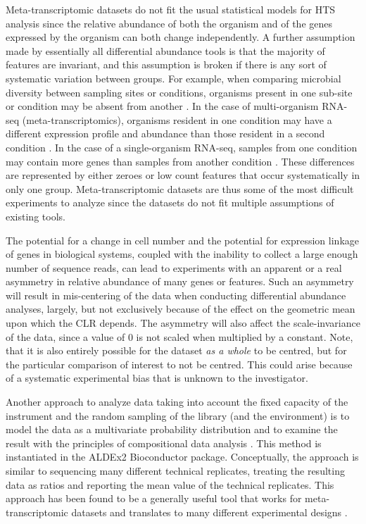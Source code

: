 \documentclass{bmcart}
\begin{document}
Meta-transcriptomic datasets do not fit the usual statistical models for HTS analysis since the relative abundance of both the organism and of the genes expressed by the organism can both change independently. A further assumption made by essentially all differential abundance tools is that the majority of features are invariant, and this assumption is broken if there is any sort of systematic variation between groups. For example, when comparing microbial diversity between sampling sites or conditions, organisms present in one sub-site or condition may be absent from another \cite{Macklaim:2015aa,Hummelen:2010,Gajer:2012}. In the case of multi-organism RNA-seq (meta-transcriptomics), organisms resident in one condition may have a different expression profile and abundance than those resident in a second condition \cite{macklaim:2013}. In the case of a single-organism RNA-seq, samples from one condition may contain more genes than samples from another condition \cite{Lang:2015aa,Peng:2014aa,Zhao:2013aa,Gierlinski:2015aa}. These differences are represented by either zeroes or low count features that occur systematically in only one group. Meta-transcriptomic datasets are thus some of the most difficult experiments to analyze \cite{fernandes:2013, macklaim:2013} since the datasets do not fit multiple assumptions of existing tools. 


The potential for a change in cell number and the potential for expression linkage of genes in biological systems, coupled with the inability to collect a large enough number of sequence reads, can lead to experiments with an apparent or a real asymmetry in relative abundance of many genes or features. Such an asymmetry will result in mis-centering of the data when conducting differential abundance analyses, largely, but not exclusively because of the effect on the geometric mean upon which the CLR depends. The asymmetry will also affect the scale-invariance of the data, since a value of 0 is not scaled when multiplied by a constant. Note, that it is also entirely possible for the dataset \emph{as a whole} to be centred, but for the particular comparison of interest to not be centred. This could arise because of a systematic experimental bias that is unknown to the investigator. 

Another approach to analyze data taking into account the fixed capacity of the instrument and the random sampling of the library (and the environment) is to model the data as a multivariate probability distribution and to examine the result with the principles of compositional data analysis \cite{Aitchison:1986,fernandes:2013}. This method is instantiated in the ALDEx2 Bioconductor package. Conceptually, the approach is similar to sequencing many different technical replicates, treating the resulting data as ratios and reporting the mean value of the technical replicates. This approach has been found to be a generally useful tool that works for meta-transcriptomic datasets \cite{macklaim:2013} and translates to many different experimental designs \cite{fernandes:2014, mcmurrough:2014}. 
\end{document}
